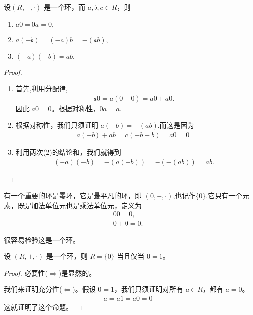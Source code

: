 \documentclass[../../main.tex]{subfiles}
\begin{document}
\begin{proposition}\label{proposition:环的加法单位元和乘法逆元的性质}
设$(R, +, \cdot)$ 是一个环，而 $a,b,c\in R$，则
\begin{enumerate}[(1)]
\item $a0 = 0a = 0,$

\item $a(-b)=(-a)b=-(ab),$

\item $(-a)(-b)=ab.$
\end{enumerate}
\end{proposition}
\begin{proof}
\begin{enumerate}[(1)]
\item 首先,利用分配律,
\begin{align*}
a0 = a(0 + 0)=a0 + a0.
\end{align*}
因此 $a0 = 0$。根据对称性，$0a = a$.

\item 根据对称性，我们只须证明 $a(-b)=-(ab)$.而这是因为
\begin{align*}
a(-b)+ab = a(-b + b)=a0 = 0.
\end{align*}

\item 利用两次(2)的结论和，我们就得到
\begin{align*}
(-a)(-b)=-(a(-b))=-(-(ab)) = ab.
\end{align*} 
\end{enumerate}
\end{proof}

\begin{definition}[零环]
有一个重要的环是零环，它是最平凡的环，即 $(0, +, \cdot)$,也记作$\{0\}$.它只有一个元素，既是加法单位元也是乘法单位元，定义为
\begin{gather*}
00 = 0 ,\\
0 + 0 = 0 .
\end{gather*} 
\end{definition}
\begin{note}
很容易检验这是一个环。
\end{note}

\begin{proposition}[零环的充要条件]\label{proposition:零环的充要条件}
设 $(R, +, \cdot)$ 是一个环，则 $R = \{0\}$ 当且仅当 $0 = 1$。
\end{proposition}
\begin{proof}
必要性($\Rightarrow$)是显然的。

我们来证明充分性($\Leftarrow$)。假设 $0 = 1$，我们只须证明对所有 $a \in R$，都有 $a = 0$。
\begin{align*}
a = a1 = a0 = 0
\end{align*}
这就证明了这个命题。 
\end{proof}
\end{document}
